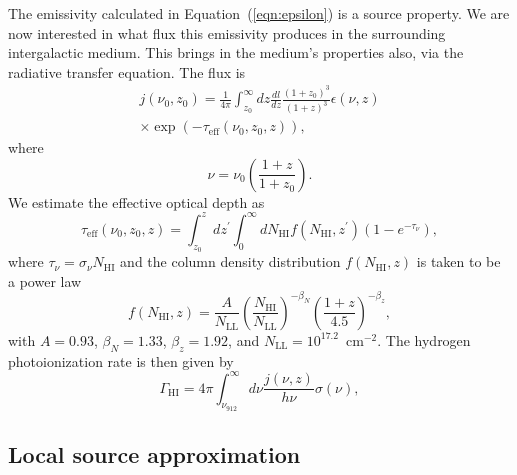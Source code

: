 \documentclass[a4paper,fleqn,usenatbib]{mnras}
\begin{document}
The emissivity calculated in Equation~(\ref{eqn:epsilon}) is a source
property.  We are now interested in what flux this emissivity produces
in the surrounding intergalactic medium.  This brings in the medium's
properties also, via the radiative transfer equation.  The flux is
\citep{2012ApJ...746..125H}
\begin{multline}
  j(\nu_0, z_0)=\frac{1}{4\pi}\int_{z_0}^\infty dz\frac{dl}{dz}\frac{(1+z_0)^3}{(1+z)^3}\epsilon(\nu,z)\\
  \times\exp{(-\tau_\mathrm{eff}(\nu_0, z_0, z))},
  \label{eqn:flux}
\end{multline}
where
\begin{equation}
  \nu = \nu_0\left(\frac{1+z}{1+z_0}\right).
\end{equation}
We estimate the effective optical depth as
\begin{equation}
  \tau_\mathrm{eff}(\nu_0, z_0, z) = \int_{z_0}^z dz^\prime\int_0^\infty dN_\mathrm{HI} f(N_\mathrm{HI}, z^\prime) (1-e^{-\tau_\nu}),
\end{equation}
where $\tau_\nu=\sigma_\nu N_\mathrm{HI}$ and the column density
distribution $f(N_\mathrm{HI}, z)$ is taken to be a power law \citep{2013MNRAS.436.1023B}
\begin{equation}
  f(N_\mathrm{HI}, z) = \frac{A}{N_\mathrm{LL}}\left(\frac{N_\mathrm{HI}}{N_\mathrm{LL}}\right)^{-\beta_N}\left(\frac{1+z}{4.5}\right)^{-\beta_z},
\end{equation}
with $A=0.93$, $\beta_N=1.33$, $\beta_z=1.92$, and
$N_\mathrm{LL}=10^{17.2}$~cm$^{-2}$.  The hydrogen photoionization
rate is then given by
\begin{equation}
  \Gamma_\mathrm{HI}=4\pi\int_{\nu_{912}}^\infty d\nu \frac{j(\nu,z)}{h\nu} \sigma(\nu),
\end{equation}

\subsection{Local source approximation}
\end{document}

